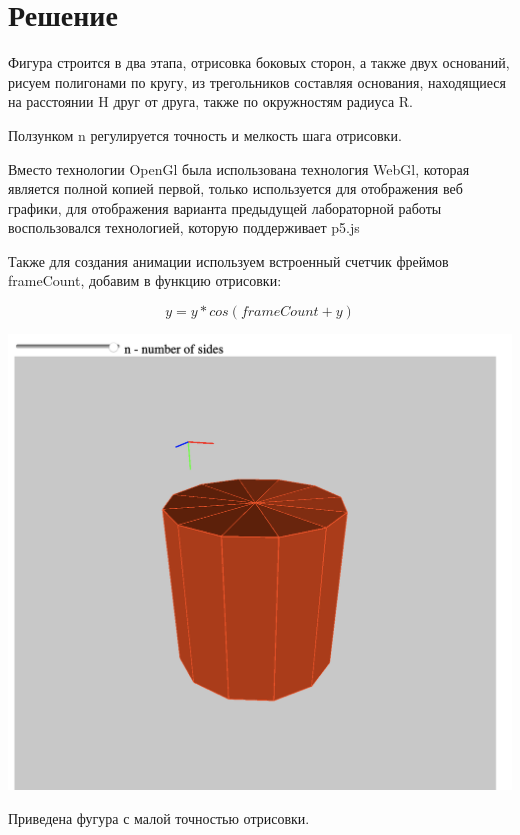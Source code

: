 \section{Решение}

Фигура строится в два этапа, отрисовка боковых сторон, а также двух оснований, рисуем полигонами по кругу, из трегольников составляя основания, находящиеся на расстоянии H друг от друга, также по окружностям радиуса R.


Ползунком n регулируется точность и мелкость шага отрисовки.

Вместо технологии OpenGl была использована технология WebGl, которая является полной копией первой, только используется для отображения веб графики, для отображения варианта предыдущей лабораторной работы воспользовался технологией, которую поддерживает p5.js

Также для создания анимации используем встроенный счетчик фреймов frameCount, добавим в функцию отрисовки:

$$ y = y * cos (frameCount + y) $$

\includegraphics[scale=0.5]{pictures/1.png}

Приведена фугура с малой точностью отрисовки.

